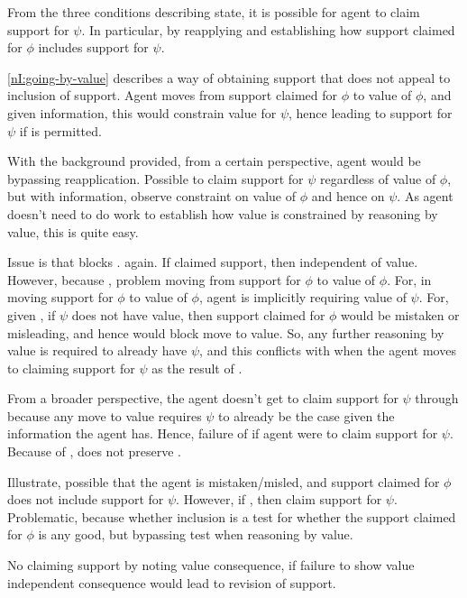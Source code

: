 \begin{note}
  From the three conditions describing state, it is possible for agent to claim support for \(\psi\).
  In particular, by reapplying and establishing how support claimed for \(\phi\) includes support for \(\psi\).

  \ref{nI:going-by-value} describes a way of obtaining support that does not appeal to inclusion of support.
  Agent moves from support claimed for \(\phi\) to value of \(\phi\), and given information, this would constrain value for \(\psi\), hence leading to support for \(\psi\) if \RBV{} is permitted.

  With the background provided, from a certain perspective, agent would be bypassing reapplication.
  Possible to claim support for \(\psi\) regardless of value of \(\phi\), but with information, observe constraint on value of \(\phi\) and hence on \(\psi\).
  As agent doesn't need to do work to establish how value is constrained by reasoning by value, this is quite easy.

  Issue is that \incl{} blocks \RBV{}.
  \eiS{} again.
  If claimed support, then independent of value.
  However, because \incl{}, problem moving from support for \(\phi\) to value of \(\phi\).
  For, in moving support for \(\phi\) to value of \(\phi\), agent is implicitly requiring value of \(\psi\).
  For, given \incl{}, if \(\psi\) does not have value, then support claimed for \(\phi\) would be mistaken or misleading, and hence would block move to value.
  So, any further reasoning by value is required to already have \(\psi\), and this conflicts with \eiS{} when the agent moves to claiming support for \(\psi\) as the result of \RBV{}.

  From a broader perspective, the agent doesn't get to claim support for \(\psi\) through \RBV{} because any move to value requires \(\psi\) to already be the case given the information the agent has.
  Hence, failure of \eiS{} if agent were to claim support for \(\psi\).
  Because of \incl{}, \RBV{} does not preserve \eiS{}.

  Illustrate, possible that the agent is mistaken/misled, and support claimed for \(\phi\) does not include support for \(\psi\).
  However, if \RBV{}, then claim support for \(\psi\).
  Problematic, because whether inclusion is a test for whether the support claimed for \(\phi\) is any good, but bypassing test when reasoning by value.

  No claiming support by noting value consequence, if failure to show value independent consequence would lead to revision of support.
\end{note}

